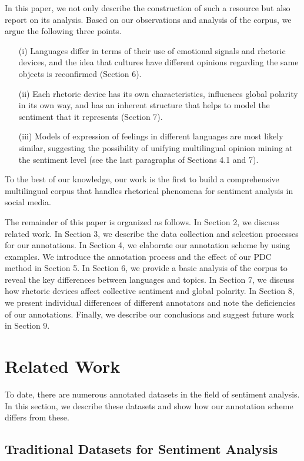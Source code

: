 \documentclass[english]{jnlp_1.4}
\begin{document}
In this paper, we not only describe the construction of such a resource but also report on its analysis. Based on our observations and analysis of the corpus, we argue the following three points. 
\begin{itemize}
\item[(i)]Languages differ in terms of their use of emotional signals and rhetoric devices, and the idea that cultures have different opinions regarding the same objects is reconfirmed (Section 6).
\item[(ii)]Each rhetoric device has its own characteristics, influences global polarity in its own way, and has an inherent structure that helps to model the sentiment that it represents (Section 7).
\item[(iii)]Models of expression of feelings in different languages are most likely similar, suggesting the possibility of unifying multilingual opinion mining at the sentiment level (see the last paragraphs of Sections 4.1 and 7). 
\end{itemize}
To the best of our knowledge, our work is the first to build a comprehensive multilingual corpus that handles rhetorical phenomena for sentiment analysis in social media.

The remainder of this paper is organized as follows. In Section 2, we discuss related work. In Section 3, we describe the data collection and selection processes for our annotations. In Section 4, we elaborate our annotation scheme by using examples. We introduce the annotation process and the effect of our PDC method in Section 5. In Section 6, we provide a basic analysis of the corpus to reveal the key differences between languages and topics. In Section 7, we discuss how rhetoric devices affect collective sentiment and global polarity. In Section 8, we present individual differences of different annotators and note the deficiencies of our annotations. Finally, we describe our conclusions and suggest future work in Section 9. 


\section{Related Work}

To date, there are numerous annotated datasets in the field of sentiment analysis. In this section, we describe these datasets and show how our annotation scheme differs from these.


\subsection{Traditional Datasets for Sentiment Analysis}
\end{document}
